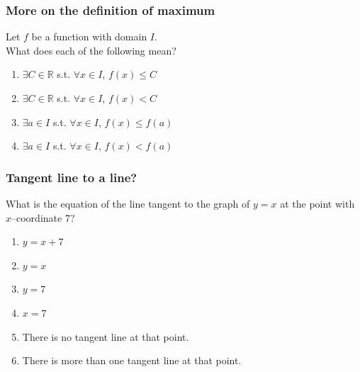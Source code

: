 \documentclass[14pt]{beamer}
\begin{document}
\begin{frame}
	\frametitle{More on the definition of maximum}

	Let $f$ be a function with domain $I$. \\ What does each of the following mean?

	\begin{enumerate}
		\item $\displaystyle \exists C \in \mathbb{R}$ s.t.
			$\displaystyle \forall x \in I$, $\displaystyle f(x) \leq C$

		\item $\displaystyle \exists C \in \mathbb{R}$ s.t.
			$\displaystyle \forall x \in I$, $\displaystyle f(x) < C$

		\item $\displaystyle \exists a \in I$ s.t. $\displaystyle \forall x \in I$, $\displaystyle
			f(x) \leq f(a)$

		\item $\displaystyle \exists a \in I$ s.t. $\displaystyle \forall x \in I$, $\displaystyle
			f(x) < f(a)$
	\end{enumerate}
\end{frame}

\begin{frame}[t]
	\frametitle{Tangent line to a line?}

	What is the equation of the line tangent to the graph of $y=x$ at the point
	with $x$--coordinate $7$?

	\begin{enumerate}
		\item $\displaystyle y=x+7$

		\item $\displaystyle y=x$

		\item $\displaystyle y=7$

		\item $\displaystyle x=7$

		\item There is no tangent line at that point.

		\item There is more than one tangent line at that point.
	\end{enumerate}
\end{frame}
\end{document}
